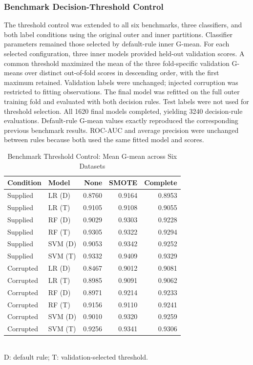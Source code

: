 \subsubsection{Benchmark Decision-Threshold Control}
\label{subsec:benchmark_threshold_control}
The threshold control was extended to all six benchmarks, three classifiers, and both label conditions using the original outer and inner partitions. Classifier parameters remained those selected by default-rule inner G-mean. For each selected configuration, three inner models provided held-out validation scores. A common threshold maximized the mean of the three fold-specific validation G-means over distinct out-of-fold scores in descending order, with the first maximum retained. Validation labels were unchanged; injected corruption was restricted to fitting observations. The final model was refitted on the full outer training fold and evaluated with both decision rules. Test labels were not used for threshold selection.
All 1620 final models completed, yielding 3240 decision-rule evaluations. Default-rule G-mean values exactly reproduced the corresponding previous benchmark results. ROC-AUC and average precision were unchanged between rules because both used the same fitted model and scores.
\begin{table}[t]
\caption{Benchmark Threshold Control: Mean G-mean across Six Datasets}
\label{tab:benchmark_threshold_control}
\centering
\begin{tabular}{llrrr}
\hline
Condition & Model & None & SMOTE & Complete\\
\hline
Supplied & LR (D) & 0.8760 & 0.9164 & 0.8953 \\
Supplied & LR (T) & 0.9105 & 0.9108 & 0.9055 \\
Supplied & RF (D) & 0.9029 & 0.9303 & 0.9228 \\
Supplied & RF (T) & 0.9305 & 0.9322 & 0.9294 \\
Supplied & SVM (D) & 0.9053 & 0.9342 & 0.9252 \\
Supplied & SVM (T) & 0.9332 & 0.9409 & 0.9329 \\
Corrupted & LR (D) & 0.8467 & 0.9012 & 0.9081 \\
Corrupted & LR (T) & 0.8985 & 0.9091 & 0.9062 \\
Corrupted & RF (D) & 0.8971 & 0.9214 & 0.9233 \\
Corrupted & RF (T) & 0.9156 & 0.9110 & 0.9241 \\
Corrupted & SVM (D) & 0.9010 & 0.9320 & 0.9259 \\
Corrupted & SVM (T) & 0.9256 & 0.9341 & 0.9306 \\
\hline
\end{tabular}
\\ D: default rule; T: validation-selected threshold.
\end{table}
